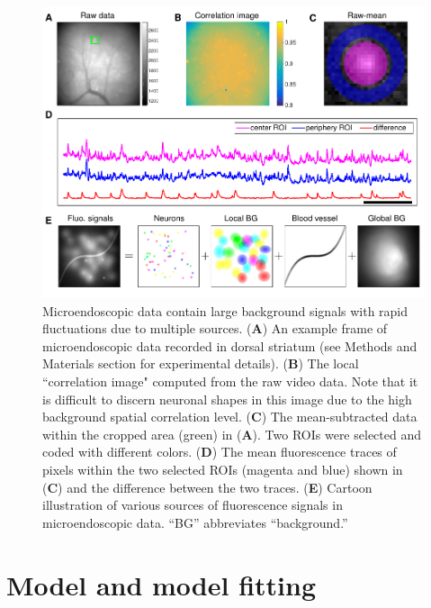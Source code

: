 \documentclass[9pt,lineno]{elife}
\begin{document}
\begin{figure}[!t]
  \includegraphics[width=1\textwidth]{Fig_introduction.pdf}
  \caption{Microendoscopic data contain large background signals with rapid fluctuations due to multiple sources. (\textbf{A}) An example frame of microendoscopic data recorded in dorsal striatum (see Methods and Materials section for experimental details). (\textbf{B}) The local ``correlation image" \citep{Smith2010} computed from the raw video data.  Note that it is difficult to discern neuronal shapes in this image due to the high background spatial correlation level. (\textbf{C}) The mean-subtracted data within the cropped area (green) in (\textbf{A}). Two ROIs were selected and coded with different colors. (\textbf{D}) The mean fluorescence traces of pixels within the two selected ROIs (magenta and blue) shown in (\textbf{C}) and the difference between the two traces. (\textbf{E}) Cartoon illustration of various sources of fluorescence signals in microendoscopic data. ``BG'' abbreviates ``background.''}
  \label{fig:intro}
\end{figure}


\section{Model and model fitting}
\end{document}
